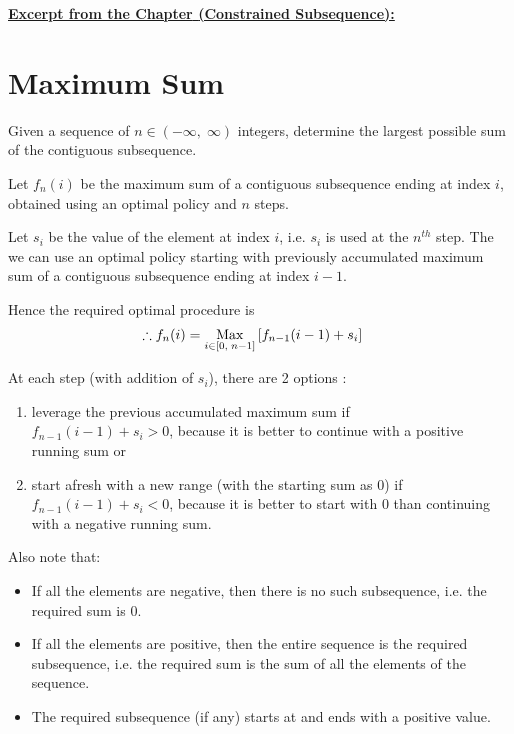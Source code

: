 \vspace{15mm}


\underline{\textbf{\textcolor{BurntOrange}{Excerpt from the Chapter} \textcolor{Sepia}{(Constrained Subsequence):}}}


\section*{Maximum Sum}
\begin{p} \label{maxsubarray : sum}
Given a sequence of $n \in (-\infty, \; \infty)$ integers, determine the largest possible sum of the contiguous subsequence.
\end{p}

\begin{s}
Let $f_n(i)$ be the maximum sum of a contiguous subsequence ending at index $i$, obtained using an optimal policy and $n$ steps.

Let $s_i$ be the value of the element at index $i$, i.e. $s_i$ is used at the $n^{th}$ step. The we can use an optimal policy starting with previously accumulated maximum sum of a contiguous subsequence ending at index $i-1$.

Hence the required optimal procedure is
\begin{align*}
\therefore f_n(i) &= \operatorname*{Max}\limits_{i \in [0, \; n-1]} \left[f_{n-1}(i-1) + s_i\right]
\end{align*}

At each step (with addition of $s_i$), there are 2 options :
\begin{enumerate}
    \item leverage the previous accumulated maximum sum if \\$f_{n-1}(i-1) + s_i > 0$, because it is better to continue with a positive running sum or
    \item start afresh with a new range (with the starting sum as 0) if $f_{n-1}(i-1) + s_i < 0$, because it is better to start with 0 than continuing with a negative running sum. 
\end{enumerate} 

Also note that:
\begin{itemize}
    \item If all the elements are negative, then there is no such subsequence, i.e. the required sum is 0.
    \item If all the elements are positive, then the entire sequence is the required subsequence, i.e. the required sum is the sum of all the elements of the sequence.  
    \item The required subsequence (if any) starts at and ends with a positive value.
\end{itemize}




\end{s}
